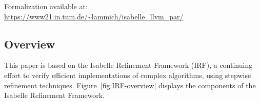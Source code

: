 \documentclass[a4paper,UKenglish,cleveref, autoref, thm-restate]{lipics-v2021}
\begin{document}


%
%

\noindent Formalization available at: \url{https://www21.in.tum.de/~lammich/isabelle_llvm_par/}


\subsection{Overview}\label{sec:intro_overview}
This paper is based on the Isabelle Refinement Framework (IRF), a continuing effort
to verify efficient implementations of complex algorithms, using stepwise refinement techniques.
Figure~\ref{fig:IRF-overview} displays the components of the Isabelle Refinement Framework.
\end{document}
